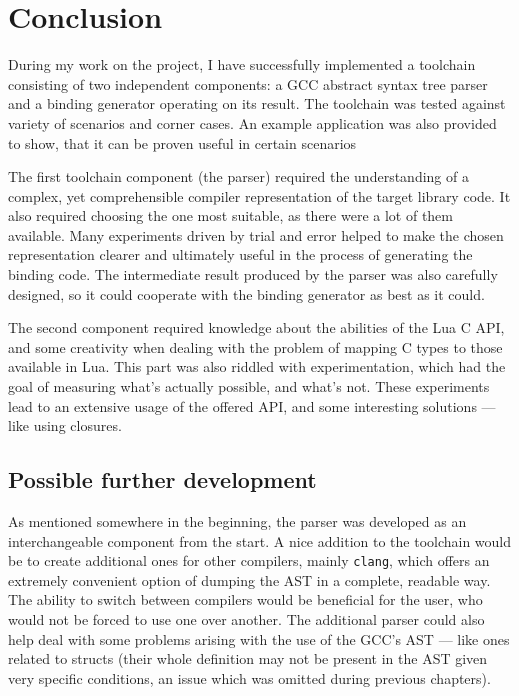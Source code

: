 \documentclass[polish, english]{iithesis}
\begin{document}
\chapter{Conclusion}
  During my work on the project, I have successfully implemented a toolchain consisting of two independent components: a GCC abstract syntax tree parser and a binding generator operating on its result.
  The toolchain was tested against variety of scenarios and corner cases.
  An example application was also provided to show, that it can be proven useful in certain scenarios

  The first toolchain component (the parser) required the understanding of a complex, yet comprehensible compiler representation of the target library code.
  It also required choosing the one most suitable, as there were a lot of them available.
  Many experiments driven by trial and error helped to make the chosen representation clearer and ultimately useful in the process of generating the binding code.
  The intermediate result produced by the parser was also carefully designed, so it could cooperate with the binding generator as best as it could.

  The second component required knowledge about the abilities of the Lua C API, and some creativity when dealing with the problem of mapping C types to those available in Lua.
  This part was also riddled with experimentation, which had the goal of measuring what's actually possible, and what's not.
  These experiments lead to an extensive usage of the offered API, and some interesting solutions --- like using closures.

  \section{Possible further development}
    As mentioned somewhere in the beginning, the parser was developed as an interchangeable component from the start.
    A nice addition to the toolchain would be to create additional ones for other compilers, mainly \texttt{clang}, which offers an extremely convenient option of dumping the AST in a complete, readable way.
    The ability to switch between compilers would be beneficial for the user, who would not be forced to use one over another.
    The additional parser could also help deal with some problems arising with the use of the GCC's AST --- like ones related to structs (their whole definition may not be present in the AST given very specific conditions, an issue which was omitted during previous chapters).
\end{document}
